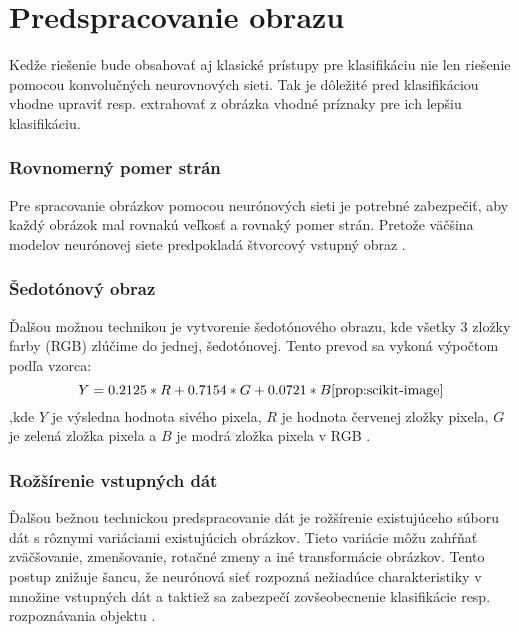
\section{Predspracovanie obrazu}


Kedže riešenie bude obsahovať aj klasické prístupy pre klasifikáciu nie len riešenie pomocou konvolučných neurovnových sieti.
Tak je dôležité pred klasifikáciou vhodne upraviť resp. extrahovať z obrázka vhodné príznaky pre ich lepšiu klasifikáciu.

\subsubsection{Rovnomerný pomer strán}
Pre spracovanie obrázkov pomocou neurónových sieti je potrebné zabezpečiť, aby každý obrázok mal rovnakú veľkosť a rovnaký pomer strán.
Pretože väčšina modelov neurónovej siete predpokladá štvorcový vstupný obraz \cite{odkaz:NNPreprocessing}.

\subsubsection{Šedotónový obraz}
Ďalšou možnou technikou je vytvorenie šedotónového obrazu, kde všetky 3 zložky farby (RGB) zlúčime do jednej, šedotónovej.
Tento prevod sa vykoná výpočtom podľa vzorca:
\begin{equation}
    \label{eq:rgbtogray}
    Y = 0.2125*R + 0.7154*G + 0.0721*B\cite{prop:scikit-image}
\end{equation}
,kde $Y$ je výsledna hodnota sivého pixela, $R$ je hodnota červenej zložky pixela,
$G$ je zelená zložka pixela a $B$ je modrá zložka pixela v RGB \cite{odkaz:NNPreprocessing}.

\subsubsection{Rožšírenie vstupných dát}
Ďalšou bežnou technickou predspracovanie dát je rožšírenie existujúceho súboru dát s rôznymi variáciami existujúcich obrázkov.
Tieto variácie môžu zahŕňať zväčšovanie, zmenšovanie, rotačné zmeny a iné transformácie obrázkov.
Tento postup znižuje šancu, že neurónová sieť rozpozná nežiadúce charakteristiky v množine vstupných dát
	a taktiež sa zabezpečí zovšeobecnenie klasifikácie resp. rozpoznávania objektu \cite{odkaz:NNPreprocessing}.

